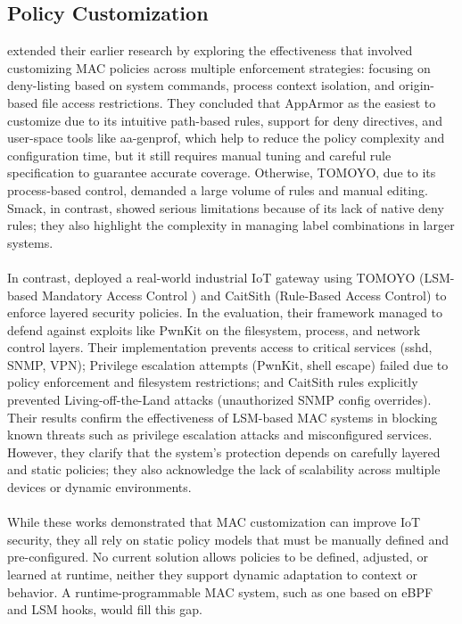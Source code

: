 \subsection{Policy Customization}

\cite{Effectiveness_of_MAC_Systems_based_on_LSM_and_their_Security_Policy_Configuration_for_Protecting_IoT_Devices} extended their earlier research by exploring the effectiveness that involved customizing MAC policies across multiple enforcement strategies: focusing on deny-listing based on system commands, process context isolation, and origin-based file access restrictions. They concluded that AppArmor  as the easiest to customize due to its intuitive path-based rules, support for deny directives, and user-space tools like aa-genprof, which help to reduce the policy complexity and configuration time, but it still requires manual tuning and careful rule specification to guarantee accurate coverage. Otherwise,  TOMOYO, due to its process-based control, demanded a large volume of rules and manual editing. Smack, in contrast, showed serious limitations because of its lack of native deny rules; they also highlight the complexity in managing label combinations in larger systems.
\\\\
In contrast, \cite{Hardening_the_Internet_of_Things} deployed a real-world industrial IoT gateway using TOMOYO (LSM-based Mandatory Access Control ) and CaitSith (Rule-Based Access Control) to enforce layered security policies.  In the evaluation, their framework managed to defend against exploits like PwnKit on the filesystem, process, and network control layers. Their implementation prevents access to critical services (sshd, SNMP, VPN); Privilege escalation attempts (PwnKit, shell escape) failed due to policy enforcement and filesystem restrictions; and CaitSith rules explicitly prevented Living-off-the-Land attacks (unauthorized SNMP config overrides). Their results confirm the effectiveness of LSM-based MAC systems in blocking known threats such as privilege escalation attacks and misconfigured services. However, they clarify that the system's protection depends on carefully layered and static policies; they also acknowledge the lack of scalability across multiple devices or dynamic environments.
\\\\
While these works demonstrated that MAC customization can improve IoT security, they all rely on static policy models that must be  manually defined and pre-configured. No current solution allows policies to be defined, adjusted, or learned at runtime, neither they support dynamic adaptation to context or behavior. A runtime-programmable MAC system, such as one based on eBPF and LSM hooks, would fill this gap.

